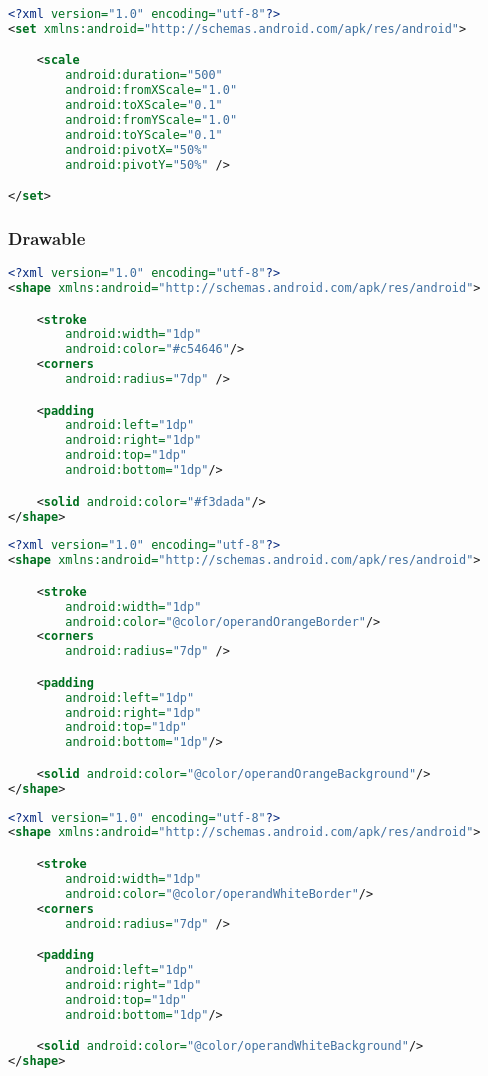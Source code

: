 \begin{lstlisting}[caption=button\_save.xml,label=list:button_save.xml,language=XML]
<?xml version="1.0" encoding="utf-8"?>
<set xmlns:android="http://schemas.android.com/apk/res/android">

    <scale
        android:duration="500"
        android:fromXScale="1.0"
        android:toXScale="0.1"
        android:fromYScale="1.0"
        android:toYScale="0.1"
        android:pivotX="50%"
        android:pivotY="50%" />

</set>
\end{lstlisting}    

\subsubsection{Drawable}

\begin{lstlisting}[caption=tile\_error.xml,label=list:tile_error.xml,language=XML]
<?xml version="1.0" encoding="utf-8"?>
<shape xmlns:android="http://schemas.android.com/apk/res/android">

    <stroke
        android:width="1dp"
        android:color="#c54646"/>
    <corners
        android:radius="7dp" />

    <padding
        android:left="1dp"
        android:right="1dp"
        android:top="1dp"
        android:bottom="1dp"/>

    <solid android:color="#f3dada"/>
</shape>
\end{lstlisting}    

\begin{lstlisting}[caption=tile\_operand\_orange.xml,label=list:tile_operand_orange.xml,language=XML]
<?xml version="1.0" encoding="utf-8"?>
<shape xmlns:android="http://schemas.android.com/apk/res/android">

    <stroke
        android:width="1dp"
        android:color="@color/operandOrangeBorder"/>
    <corners
        android:radius="7dp" />

    <padding
        android:left="1dp"
        android:right="1dp"
        android:top="1dp"
        android:bottom="1dp"/>

    <solid android:color="@color/operandOrangeBackground"/>
</shape>
\end{lstlisting}    

\begin{lstlisting}[caption=tile\_operand\_white.xml,label=list:tile_operand_white.xml,language=XML]
<?xml version="1.0" encoding="utf-8"?>
<shape xmlns:android="http://schemas.android.com/apk/res/android">

    <stroke
        android:width="1dp"
        android:color="@color/operandWhiteBorder"/>
    <corners
        android:radius="7dp" />

    <padding
        android:left="1dp"
        android:right="1dp"
        android:top="1dp"
        android:bottom="1dp"/>

    <solid android:color="@color/operandWhiteBackground"/>
</shape>
\end{lstlisting}    

